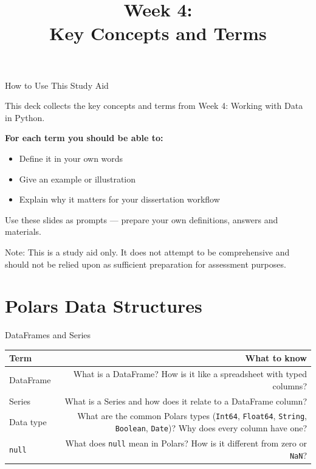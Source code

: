\documentclass[9pt,aspectratio=169]{beamer}
\title{\LARGE \textnormal{Week 4: \\
Key Concepts and Terms}}
\begin{document}
\begin{frame}[plain]
\titlepage
\end{frame}


\begin{frame}{How to Use This Study Aid}

This deck collects the \alert{key concepts and terms} from Week 4: Working with Data in Python.

\medskip

\textbf{For each term you should be able to:}
\begin{itemize}
    \item Define it in your own words
    \item Give an example or illustration
    \item Explain why it matters for your dissertation workflow
\end{itemize}

\medskip

Use these slides as prompts --- prepare your own definitions, answers and materials.

\medskip

\alert{Note:} This is a study aid only. It does not attempt to be comprehensive and should not be relied upon as sufficient preparation for assessment purposes.

\end{frame}


\section{Polars Data Structures}

\begin{frame}{DataFrames and Series}

\begin{tabular}{@{}lR@{}}
\toprule
\textbf{Term} & \textbf{What to know} \\
\midrule
\alert{DataFrame} & What is a DataFrame? How is it like a spreadsheet with typed columns? \\[0.8em]
\alert{Series} & What is a Series and how does it relate to a DataFrame column? \\[0.8em]
\alert{Data type} & What are the common Polars types (\texttt{Int64}, \texttt{Float64}, \texttt{String}, \texttt{Boolean}, \texttt{Date})? Why does every column have one? \\[0.8em]
\alert{\texttt{null}} & What does \texttt{null} mean in Polars? How is it different from zero or \texttt{NaN}? \\
\bottomrule
\end{tabular}

\end{frame}
\end{document}
